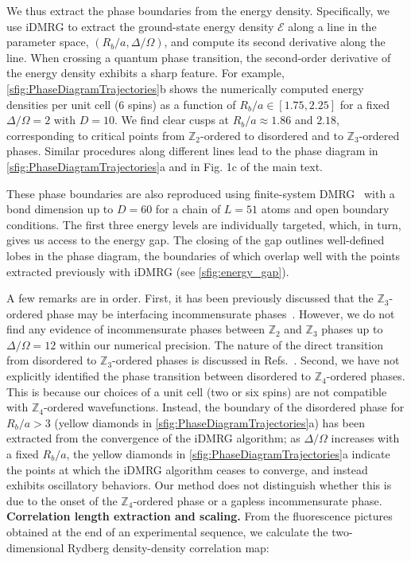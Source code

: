 \documentclass[prl,nobalancelastpage,superscriptaddress,twocolumn,nofootinbib]{revtex4}
\newcommand{\pargap}{\\[12pt]}
\begin{document}
We thus extract the phase boundaries from the energy density. Specifically, we use iDMRG to extract the ground-state energy density $\mathcal{E}$ along a line in the parameter space, $(R_b/a, \Delta/\Omega)$, and compute its second derivative along the line. When crossing a quantum phase transition, the second-order derivative of the energy density exhibits a sharp feature. For example, \ref{sfig:PhaseDiagramTrajectories}b shows the numerically computed energy densities per unit cell (6 spins) as a function of $R_b/a \in [1.75, 2.25]$ for a fixed $\Delta /\Omega = 2$ with $D = 10$. We find clear cusps at $R_b/a \approx 1.86$ and $2.18$, corresponding to critical points from $\mathbb{Z}_2$-ordered to disordered and to $\mathbb{Z}_3$-ordered phases. Similar procedures along different lines lead to the phase diagram in \ref{sfig:PhaseDiagramTrajectories}a and in Fig. 1c of the main text.

These phase boundaries are also reproduced using finite-system DMRG~\cite{schollwock2005density, schollwock2011density} with a bond dimension up to $D = 60$ for a chain of $L=51$ atoms and open boundary conditions. The first three energy levels are individually targeted, which, in turn, gives us access to the energy gap. The closing of the gap outlines well-defined lobes in the phase diagram, the boundaries of which overlap well with the points extracted previously with iDMRG (see \ref{sfig:energy_gap}).

A few remarks are in order. First, it has been previously discussed that the $\mathbb{Z}_3$-ordered phase may be interfacing incommensurate phases~\cite{Fendley2004}. However, we do not find any evidence of incommensurate phases between $\mathbb{Z}_2$ and $\mathbb{Z}_3$ phases up to $\Delta/\Omega = 12$ within our numerical precision. The nature of the direct transition from disordered to $\mathbb{Z}_3$-ordered phases is discussed in Refs.~\cite{Samajdar2018, Whitsitt2018, Chepiga2018}. Second, we have not explicitly identified the phase transition between disordered to $\mathbb{Z}_4$-ordered phases. This is because our choices of a unit cell (two or six spins) are not compatible with $\mathbb{Z}_4$-ordered wavefunctions. Instead, the boundary of the disordered phase for $R_b/a > 3$ (yellow diamonds in \ref{sfig:PhaseDiagramTrajectories}a) has been extracted from the convergence of the iDMRG algorithm; as $\Delta/\Omega$ increases with a fixed $R_b/a$, the yellow diamonds in \ref{sfig:PhaseDiagramTrajectories}a indicate the points at which the iDMRG algorithm ceases to converge, and instead exhibits oscillatory behaviors. Our method does not distinguish whether this is due to the onset of the $\mathbb{Z}_4$-ordered phase or a gapless incommensurate phase.
\pargap
\noindent\textbf{Correlation length extraction and scaling.} From the fluorescence pictures obtained at the end of an experimental sequence, we calculate the two-dimensional Rydberg density-density correlation map:
\end{document}
